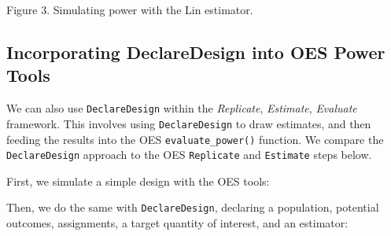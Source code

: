 \documentclass[
  12pt,
]{book}
\newenvironment{Shaded}{\begin{snugshade}}{\end{snugshade}}
\newcommand{\DataTypeTok}[1]{\textcolor[rgb]{0.13,0.29,0.53}{#1}}
\newcommand{\DecValTok}[1]{\textcolor[rgb]{0.00,0.00,0.81}{#1}}
\newcommand{\FloatTok}[1]{\textcolor[rgb]{0.00,0.00,0.81}{#1}}
\newcommand{\KeywordTok}[1]{\textcolor[rgb]{0.13,0.29,0.53}{\textbf{#1}}}
\newcommand{\NormalTok}[1]{#1}
\newcommand{\OperatorTok}[1]{\textcolor[rgb]{0.81,0.36,0.00}{\textbf{#1}}}
\newcommand{\StringTok}[1]{\textcolor[rgb]{0.31,0.60,0.02}{#1}}
\theoremstyle{definition}
\theoremstyle{definition}
\theoremstyle{definition}
\theoremstyle{remark}
\begin{document}
Figure 3. Simulating power with the Lin estimator.

\hypertarget{incorporating-declaredesign-into-oes-power-tools}{%
\subsection{Incorporating DeclareDesign into OES Power
Tools}\label{incorporating-declaredesign-into-oes-power-tools}}

We can also use \texttt{DeclareDesign} within the \emph{Replicate},
\emph{Estimate}, \emph{Evaluate} framework. This involves using
\texttt{DeclareDesign} to draw estimates, and then feeding the results
into the OES \texttt{evaluate\_power()} function. We compare the
\texttt{DeclareDesign} approach to the OES \texttt{Replicate} and
\texttt{Estimate} steps below.

First, we simulate a simple design with the OES tools:

\begin{Shaded}
\end{Shaded}

Then, we do the same with \texttt{DeclareDesign}, declaring a
population, potential outcomes, assignments, a target quantity of
interest, and an estimator:
\end{document}
